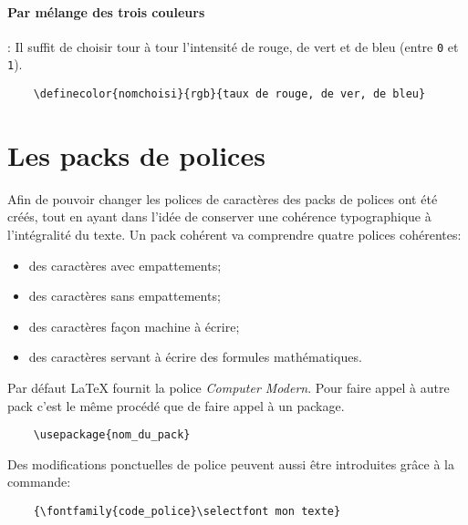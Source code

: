 \paragraph*{Par mélange des trois couleurs}: Il suffit de choisir tour à tour l'intensité de rouge, de vert et de bleu (entre \texttt{0} et \texttt{1}).
\begin{verbatim}
    \definecolor{nomchoisi}{rgb}{taux de rouge, de ver, de bleu}
\end{verbatim}
\medskip

\section{Les packs de polices}
Afin de pouvoir changer les polices de caractères des packs de polices ont été créés, tout en ayant dans l'idée de conserver  une cohérence typographique à l'intégralité du texte. Un pack cohérent va comprendre quatre polices cohérentes:
\begin{itemize}
    \item des caractères avec empattements;
    \item des caractères sans empattements;
    \item des caractères façon machine à écrire;
    \item des caractères servant à écrire des formules mathématiques.
\end{itemize}
\medskip

Par défaut \LaTeX{} fournit la police \textit{Computer Modern}. Pour faire appel à autre pack c'est le même procédé que de faire appel à un package.
\begin{verbatim}
    \usepackage{nom_du_pack}
\end{verbatim}
\medskip

Des modifications ponctuelles de police peuvent aussi être introduites grâce à la commande:
\begin{verbatim}
    {\fontfamily{code_police}\selectfont mon texte}
\end{verbatim}
\medskip

